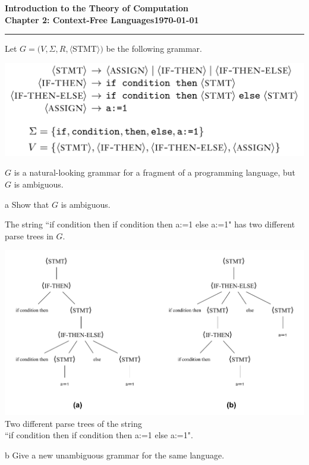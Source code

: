 \documentclass[11pt]{article}
\newcommand{\dated}{\today}
\begin{document}
\textbf{Introduction to the Theory of
Computation}\hfill\textbf{\myname}\\[0.01in]
\textbf{Chapter 2: Context-Free Languages}\hfill\textbf{\dated}\\
\smallskip\hrule\bigskip

\begin{problem}{2.27}
Let $G = (V, \Sigma, R, \langle$STMT$\rangle)$ be the following grammar.
\begin{center}
\includegraphics[scale=0.4]{Figures/Problem2.27a.pdf} \\
\end{center}
$G$ is a natural-looking grammar for a fragment of a programming language, but $G$ is ambiguous.
\end{problem}

\begin{problem}[Part]{a}
Show that $G$ is ambiguous.
\end{problem}

The string ``if condition then if condition then a:=1 else a:=1" has two different parse trees in $G$.
\begin{center}
\includegraphics[scale=0.7]{Figures/Problem2.27b.pdf} \\
Two different parse trees of the string \\
``if condition then if condition then a:=1 else a:=1".
\end{center}

\begin{problem}[Part]{b}
Give a new unambiguous grammar for the same language.
\end{problem}
\end{document}
